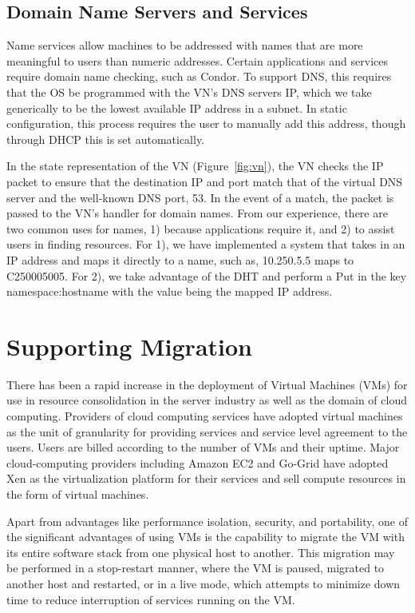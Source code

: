 \subsection{Domain Name Servers and Services}
Name services allow machines to be addressed with names that are more
meaningful to users than numeric addresses.  Certain applications and
services require domain name checking, such as Condor.  To support DNS, this
requires that the OS be programmed with the VN's DNS servers IP, which we take
generically to be the lowest available IP address in a subnet.  In static
configuration, this process requires the user to manually add this address,
though through DHCP this is set automatically.

In the state representation of the VN (Figure~\ref{fig:vn}), the VN checks the IP packet
to ensure that the destination IP and port match that of the virtual DNS
server and the well-known DNS port, 53.  In the event of a match, the packet is
passed to the VN's handler for domain names.  From our experience, there are
two common uses for names, 1) because applications require it, and 2) to assist
users in finding resources.  For 1), we have implemented a system
that takes in an IP address and maps it directly to a name, such as, 10.250.5.5
maps to C250005005.  For 2), we take advantage of the DHT and perform a Put
in the key namespace:hostname with the value being the mapped IP address.

\section{Supporting Migration}
There has been a rapid increase in the deployment of Virtual Machines (VMs) for
use in resource consolidation in the server industry as well as the domain of
cloud computing.  Providers of cloud computing services have adopted virtual
machines as the unit of granularity for providing services and service level
agreement to the users.  Users are billed according to the number of VMs and
their uptime. Major cloud-computing providers including Amazon EC2 and Go-Grid
have adopted Xen as the virtualization platform for their services and sell
compute resources in the form of virtual machines.

Apart from advantages like performance isolation, security, and portability, one
of the significant advantages of using VMs is the capability to migrate the VM
with its entire software stack from one physical host to another.  This
migration may be performed in a stop-restart manner, where the VM is paused,
migrated to another host and restarted, or in a live mode, which attempts to
minimize down time to reduce interruption of services running on the VM.

